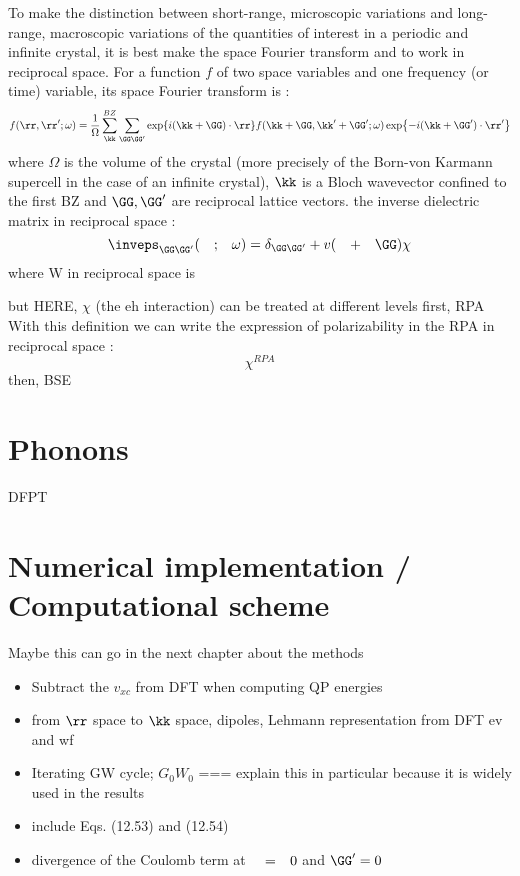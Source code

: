 To make the distinction between short-range, microscopic variations and long-range, macroscopic variations of the quantities of interest in a periodic and infinite crystal, it is best make the space Fourier transform and to work in reciprocal space. For a function $f$ of two space variables and one frequency (or time) variable, its space Fourier transform is :
\begin{equation}
	f(\rr,\rr';\omega) = \frac{1}{\Omega} \sum_{\kk}^{BZ} \sum_{\GG\GG'} \exp{i(\kk+\GG)\cdot\rr} f(\kk+\GG,\kk'+\GG';\omega)  \exp{-i(\kk+\GG')\cdot\rr'}
\end{equation}
where $\Omega$ is the volume of the crystal (more precisely of the Born-von Karmann supercell in the case of an infinite crystal), $\kk$ is a Bloch wavevector confined to the first \gls{BZ} and $\GG,\GG'$ are reciprocal lattice vectors.
the inverse dielectric matrix in reciprocal space :
\begin{equation}
	\inveps_{\GG\GG'}(\qq;\omega) = \delta_{\GG\GG'} + v(\qq+\GG)\chi
\end{equation}
where W in reciprocal space is 
\begin{equation}
\end{equation}

but HERE, $\chi$ (the eh interaction) can be treated at different levels
first, RPA
With this definition we can write the expression of polarizability in the \gls{RPA} in reciprocal space :
\begin{equation}
	\chi^{RPA}
\end{equation}
then, BSE 



\section{Phonons}
DFPT

\section{Numerical implementation / Computational scheme}
Maybe this can go in the next chapter about the methods
\begin{itemize}
	\item Subtract the $v_{xc}$ from DFT when computing QP energies
	\item from $\rr$ space to $\kk$ space, dipoles, Lehmann representation from DFT ev and wf
	\item Iterating GW cycle; $G_0W_0$ === explain this in particular because it is widely used in the results
	\item include \cite{martin2016interacting} Eqs. (12.53) and (12.54)
	\item divergence of the Coulomb term at $\qq = 0$ and $\GG' =0$
\end{itemize}